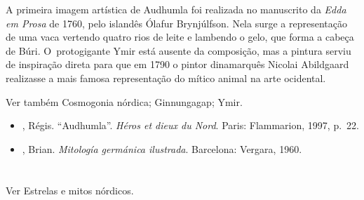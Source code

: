 A primeira imagem artística de Audhumla foi realizada no manuscrito da
\emph{Edda em Prosa} de 1760, pelo islandês Ólafur Brynjúlfson. Nela
surge a representação de uma vaca vertendo quatro rios de leite e
lambendo o gelo, que forma a cabeça de Búri. O~protogigante Ymir está
ausente da composição, mas a pintura serviu de inspiração direta para
que em 1790 o pintor dinamarquês Nicolai Abildgaard realizasse a mais
famosa representação do mítico animal na arte ocidental.

Ver também Cosmogonia nórdica; Ginnungagap; Ymir.



\begin{itemize}\footnotesize
\item
  , Régis. ``Audhumla''. \emph{Héros et dieux du Nord}. Paris:
  Flammarion, 1997, p.~22.
\item
  , Brian. \emph{Mitología germánica ilustrada}. Barcelona:
  Vergara, 1960.
\end{itemize}

\section{}

Ver Estrelas e mitos nórdicos.
